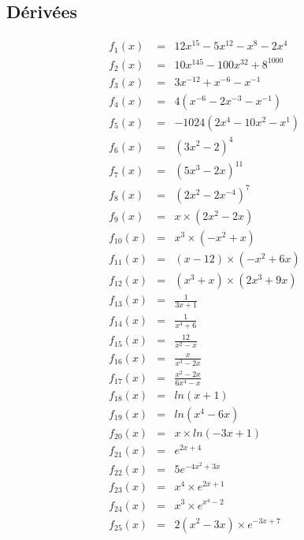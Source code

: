 \documentclass[11pt]{article}
\begin{document}

\setlength{\columnseprule}{1pt}

\begin{multicols}{3}
\section*{Dérivées}

\begin{eqnarray*}
f_{1}(x) &=& 12x^{15} - 5x^{12} - x^{8} - 2x^{4}\\
f_{2}(x) &=& 10x^{145} - 100x^{32} + 8^{1000}\\
f_{3}(x) &=& 3x^{-12} + x^{-6} - x^{-1}\\
f_{4}(x) &=& 4(x^{-6} - 2x^{-3} - x^{-1})\\
f_{5}(x) &=& -1024 (2x^{4} - 10x^{2} - x^{1})\\
f_{6}(x) &=& (3x^{2} - 2)^{4}\\
f_{7}(x) &=& (5x^{3} - 2x)^{11}\\
f_{8}(x) &=& (2x^{2} - 2x^{-4})^{7}\\
f_{9}(x) &=& x \times (2x^{2} - 2x)\\
f_{10}(x) &=& x^3 \times (-x^{2} + x) \\
f_{11}(x) &=& (x - 12) \times (-x^{2} + 6x)\\
f_{12}(x) &=& (x^3 + x) \times (2x^{3} + 9x)\\
f_{13}(x) &=& \frac{1}{3x + 1}\\
f_{14}(x) &=& \frac{1}{x^4 + 6}\\
f_{15}(x) &=& \frac{12}{x^2 - x}\\
f_{16}(x) &=& \frac{x}{x^3 - 2x}\\
f_{17}(x) &=& \frac{x^2 - 2x}{6x^4 - x}\\
f_{18}(x) &=& ln(x+1)\\
f_{19}(x) &=& ln(x^4 - 6x)\\
f_{20}(x) &=& x \times ln(-3x + 1)\\
f_{21}(x) &=& e^{2x +4}\\
f_{22}(x) &=& 5 e^{-4x^2 + 3x}\\
f_{23}(x) &=& x^4 \times e^{2x + 1}\\
f_{24}(x) &=& x^3 \times e^{x^4 - 2}\\
f_{25}(x) &=& 2 (x^2 - 3x) \times e^{-3x + 7}\\

\end{eqnarray*}
\end{multicols}
\end{document}
